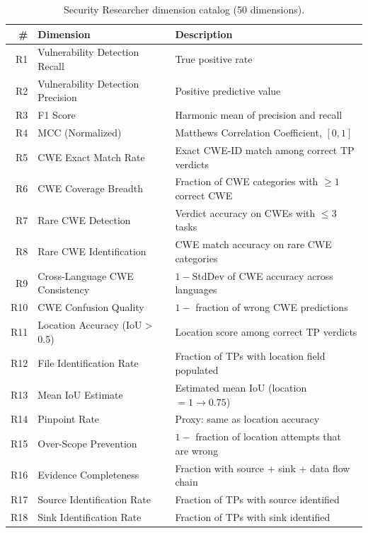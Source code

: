 \documentclass[10pt,twocolumn]{article}
\begin{document}
\begin{table}[t]
\centering
\caption{Security Researcher dimension catalog (50 dimensions).}
\label{tab:researcher_dims}
\small
\begin{tabular}{@{}r l p{7.5cm}@{}}
\toprule
\textbf{\#} & \textbf{Dimension} & \textbf{Description} \\
\midrule
R1  & Vulnerability Detection Recall      & True positive rate \\
R2  & Vulnerability Detection Precision   & Positive predictive value \\
R3  & F1 Score                            & Harmonic mean of precision and recall \\
R4  & MCC (Normalized)                    & Matthews Correlation Coefficient, $[0,1]$ \\
R5  & CWE Exact Match Rate               & Exact CWE-ID match among correct TP verdicts \\
R6  & CWE Coverage Breadth                & Fraction of CWE categories with ${\geq}1$ correct CWE \\
R7  & Rare CWE Detection                  & Verdict accuracy on CWEs with ${\leq}3$ tasks \\
R8  & Rare CWE Identification             & CWE match accuracy on rare CWE categories \\
R9  & Cross-Language CWE Consistency      & $1 - \text{StdDev}$ of CWE accuracy across languages \\
R10 & CWE Confusion Quality               & $1 -$ fraction of wrong CWE predictions \\
R11 & Location Accuracy (IoU${>}$0.5)     & Location score among correct TP verdicts \\
R12 & File Identification Rate            & Fraction of TPs with location field populated \\
R13 & Mean IoU Estimate                   & Estimated mean IoU (location$=1 \rightarrow 0.75$) \\
R14 & Pinpoint Rate                       & Proxy: same as location accuracy \\
R15 & Over-Scope Prevention               & $1 -$ fraction of location attempts that are wrong \\
R16 & Evidence Completeness               & Fraction with source + sink + data flow chain \\
R17 & Source Identification Rate           & Fraction of TPs with source identified \\
R18 & Sink Identification Rate             & Fraction of TPs with sink identified \\

\end{tabular}
\end{table}
\end{document}
